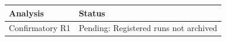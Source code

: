 \begin{tabular}{ll}
\toprule
Analysis & Status \\
\midrule
Confirmatory R1 & Pending: Registered runs not archived \\
\bottomrule
\end{tabular}
